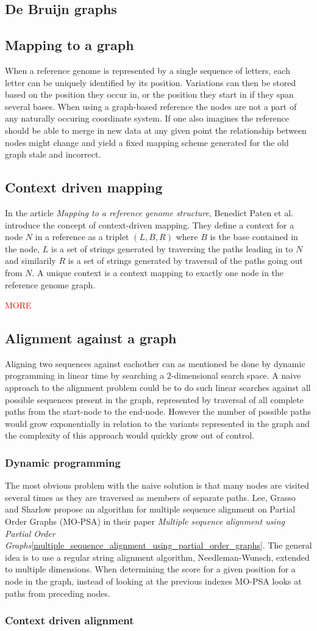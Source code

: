 \documentclass[thesis.tex]{subfiles}
\begin{document}
\subsection{De Bruijn graphs}
\subsection{Mapping to a graph}
When a reference genome is represented by a single sequence of letters, each letter can be uniquely identified by its position. Variations can then be stored based on the position they occur in, or the position they start in if they span several bases. When using a graph-based reference the nodes are not a part of any naturally occuring coordinate system. If one also imagines the reference should be able to merge in new data at any given point the relationship between nodes might change and yield a fixed mapping scheme generated for the old graph stale and incorrect.
\subsection{Context driven mapping}
In the article \textit{Mapping to a reference genome structure}\cite{mapping_to_a_reference_genome_structure}, Benedict Paten et al. introduce the concept of context-driven mapping. They define a context for a node $N$ in a reference as a triplet $(L, B, R)$ where $B$ is the base contained in the node, $L$ is a set of strings generated by traversing the paths leading in to $N$ and similarily $R$ is a set of strings generated by traversal of the paths going out from $N$. A unique context is a context mapping to exactly one node in the reference genome graph.

\textcolor{red}{MORE}
\subsection{Alignment against a graph}
Aligning two sequences against eachother can as mentioned be done by dynamic programming in linear time by searching a 2-dimensional search space. A naive approach to the alignment problem could be to do such linear searches against all possible sequences present in the graph, represented by traversal of all complete paths from the start-node to the end-node. However the number of possible paths would grow exponentially in relation to the variants represented in the graph and the complexity of this approach would quickly grow out of control. 
\subsubsection{Dynamic programming}
The most obvious problem with the naive solution is that many nodes are visited several times as they are traversed as members of separate paths. Lee, Grasso and Sharlow propose an algorithm for multiple sequence alignment on Partial Order Graphs (MO-PSA) in their paper \textit{Multiple sequence alignment using Partial Order Graphs}\ref{multiple_sequence_alignment_using_partial_order_graphs}. The general idea is to use a regular string alignment algorithm, Needleman-Wunsch, extended to multiple dimensions. When determining the score for a given position for a node in the graph, instead of looking at the previous indexes MO-PSA looks at paths from preceding nodes. 
\subsubsection{Context driven alignment}
\end{document}
